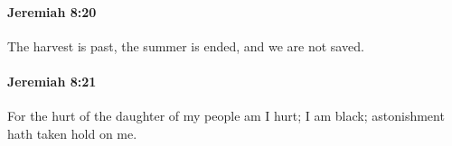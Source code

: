 		\paragraph{Jeremiah 8:20} %
			\label{JEREMIAH-8-20}

			The harvest is past, the summer is ended, and we are not saved.


		\paragraph{Jeremiah 8:21} %
			\label{JEREMIAH-8-21}

			For the hurt of the daughter of my people am I hurt; I am black; astonishment hath taken hold on me.


